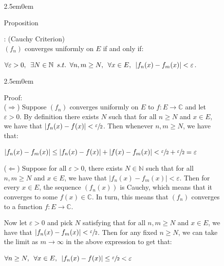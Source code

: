 \documentclass{book}
\newcommand{\hTwo}{%
   \color{MidnightBlue}%
   \fontsize{13}{15}\selectfont%
}
\newcommand{\hThree}{%
   \color{PineGreen!85!Orange}
   \fontsize{13}{15}\selectfont%
}
\newenvironment{myIndent}{%
   \begin{adjustwidth}{2.5em}{0em}%
}{%
   \end{adjustwidth}%
}
\newcommand{\suchthat}{ \hspace{0.5em}s.t.\hspace{0.5em}}
\newcommand{\myHS}{ \hspace{0.5em}}
\newcounter{PropNumber}
\newcommand{\propCount}[1][1]{%
   \addtocounter{PropNumber}{#1}%
   \thePropNumber%
}
\newcommand{\retTwo}{\hfill\bigbreak}
\begin{document}
{\begin{myIndent}\hTwo
   Proposition \propCount: (Cauchy Criterion)\\
   $(f_n)$ converges uniformly on $E$ if and only if:
   
   {\centering $\forall \varepsilon > 0, \myHS \exists N \in \mathbb{N} \suchthat \forall n,m \geq N,\myHS \forall x \in E, \myHS |f_n(x) - f_m(x)| < \varepsilon$.\retTwo\par} 
   
   {\begin{myIndent}\hThree
      Proof:\\
      ($\Longrightarrow$) Suppose $(f_n)$ converges uniformly on $E$ to $f: E \longrightarrow \mathbb{C}$ and let\\ $\varepsilon > 0$. By definition there exists $N$ such that for all $n \geq N$ and $x \in E$,\\ we have that $|f_n(x) - f(x)| < \sfrac{\varepsilon}{2}$. Then whenever $n, m \geq N$, we have\\ that:

      {\centering $|f_n(x) - f_m(x)| \leq |f_n(x) - f(x)| + |f(x) - f_m(x)| < \sfrac{\varepsilon}{2} + \sfrac{\varepsilon}{2} = \varepsilon$ \retTwo\par}

      ($\Longleftarrow$) Suppose for all $\varepsilon > 0$, there exists $N \in \mathbb{N}$ such that for all\\ $n,m \geq N$ and $x \in E$, we have that $|f_n(x) - f_m(x)| < \varepsilon$. Then for\\ every $x \in E$, the sequence $(f_n(x))$ is Cauchy, which means that it\\ converges to some $f(x) \in \mathbb{C}$. In turn, this means that $(f_n)$ converges\\ to a function $f: E \longrightarrow \mathbb{C}$. \retTwo

      Now let $\varepsilon > 0$ and pick $N$ satisfying that for all $n,m \geq N$ and $x \in E$, we\\ have that $|f_n(x) - f_m(x)| < \sfrac{\varepsilon}{2}$. Then for any fixed $n \geq N$, we can take\\ the limit as $m \rightarrow \infty$ in the above expression to get that:

      {\centering $\forall n \geq N,\myHS \forall x \in E, \myHS |f_n(x) - f(x)| \leq \sfrac{\varepsilon}{2} < \varepsilon $ \retTwo\par}
   \end{myIndent}}


\end{myIndent}}
\end{document}

